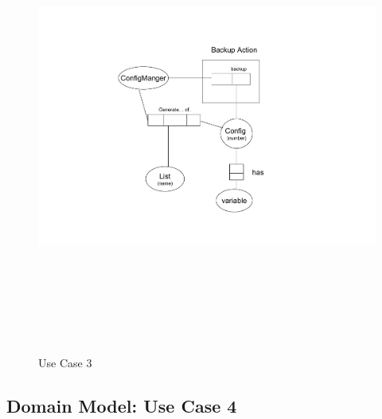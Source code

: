 \begin{figure}[htbp]
  \centering
  \includegraphics[angle=0,width=15cm,height=15cm]{"domainmodel-usecase3"}
  \caption{Use Case 3}
  \label{fig:usecase3}
\end{figure}

\newpage
\subsection{Domain Model: Use Case 4}

